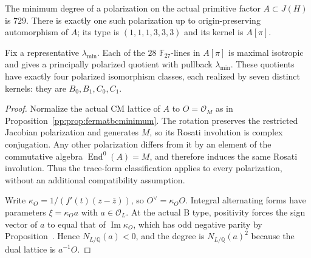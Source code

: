\begin{proposition}
\label{pp:prop:fermatminpolarization}
The minimum degree of a polarization on the actual primitive factor
$A\subset J(H)$ is $729$. There is exactly one such polarization
up to origin-preserving automorphism of $A$; its type is
$(1,1,1,3,3,3)$ and its kernel is $A[\pi]$.

Fix a representative $\lambda_{\min}$. Each of the $28$
$\mathbb F_{27}$-lines in $A[\pi]$ is maximal isotropic and gives
a principally polarized quotient with pullback $\lambda_{\min}$.
These quotients have exactly four polarized isomorphism classes,
each realized by seven distinct kernels: they are $B_0,B_1,C_0,C_1$.
\end{proposition}
\begin{proof}
Normalize the actual CM lattice of $A$ to $O=\mathcal O_M$ as in
Proposition~\ref{pp:prop:fermatbcminimum}. The rotation preserves the
restricted Jacobian polarization and generates $M$, so its Rosati
involution is complex conjugation. Any other polarization differs
from it by an element of the commutative algebra
$\operatorname{End}^0(A)=M$, and therefore induces the same Rosati
involution. Thus the trace-form classification applies to every
polarization, without an additional compatibility assumption.

Write $\kappa_O=1/(f'(t)(z-\bar z))$, so $O^\vee=\kappa_O O$.
Integral alternating forms have parameters $\xi=\kappa_O a$ with
$a\in\mathcal O_L$. At the actual B type, positivity forces the
sign vector of $a$ to equal that of $\operatorname{Im}\kappa_O$,
which has odd negative parity by
Proposition~. Hence
$N_{L/\mathbb Q}(a)<0$, and the degree is
$N_{L/\mathbb Q}(a)^2$ because the dual lattice is $a^{-1}O$.


\end{proof}
